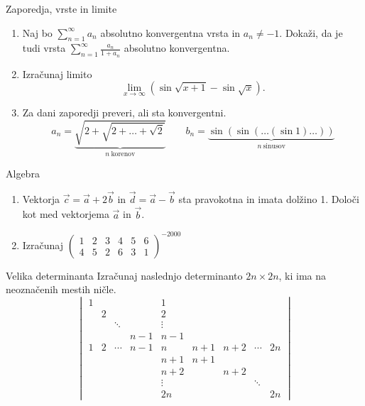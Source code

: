\begin{frame}{Zaporedja, vrste in limite}
	\begin{enumerate}
		\item 
		Naj bo $\sum_{n=1}^\infty a_n$ absolutno konvergentna vrsta in $a_n \ne -1$.
		Dokaži, da je tudi vrsta $\sum_{n=1}^\infty \frac{a_n}{1+a_n}$
		absolutno konvergentna.

		\item
		Izračunaj limito
		$$ \lim_{x \to \infty} (\sin\sqrt{x+1}-\sin\sqrt{x}). $$

		\item
		Za dani zaporedji preveri, ali sta konvergentni.
		$$
			a_n = \underbrace{\sqrt{2+\sqrt{2+\dots+\sqrt{2}}}}_{n~\text{korenov}} \qquad
			b_n = \underbrace{\sin(\sin(\dots(\sin 1)\dots))}_{n~\text{sinusov}}
		$$
	\end{enumerate}
\end{frame}

\begin{frame}{Algebra}
	\begin{enumerate}
		\item
		Vektorja $\vec{c} = \vec{a} + 2\vec{b}$ in $\vec{d} = \vec{a} - \vec{b}$
		sta pravokotna in imata dolžino 1. Določi kot med vektorjema $\vec{a}$ in $\vec{b}$.
		\item 
		Izračunaj
		$ \displaystyle{\begin{pmatrix}1&2&3&4&5&6\\4&5&2&6&3&1\end{pmatrix}^{-2000}} $
	\end{enumerate}
\end{frame}

\begin{frame}{Velika determinanta}
	Izračunaj naslednjo determinanto $2n \times 2n$, ki ima na neoznačenih mestih ničle.
	$$
		\begin{vmatrix}
			1 &&&& 1 &&&& \\
			& 2 &&& 2 &&&& \\
			&& \ddots && \vdots &&&& \\
			&&& n-1 & n-1 &&&& \\
			1 & 2 & \cdots & n-1 & n & n+1 & n+2 & \cdots & 2n \\
			&&&& n+1 & n+1 &&& \\
			&&&& n+2 && n+2 && \\
			&&&& \vdots &&& \ddots & \\
			&&&& 2n &&&& 2n
		\end{vmatrix}
	$$
\end{frame}

